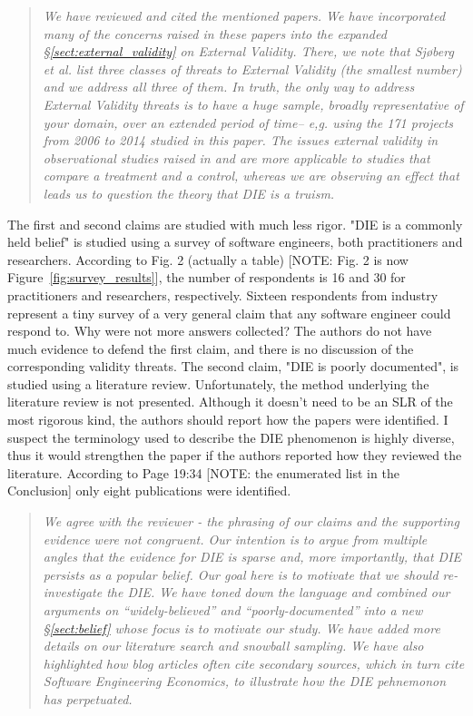 \documentclass[smallcondensed]{svjour3}
\newcommand{\tion}[1]{\S\ref{sect:#1}}
\newcommand{\fig}[1]{Figure~\ref{fig:#1}}
\begin{document}
\begin{quote}{\em 
 We have reviewed and cited the mentioned papers. We have incorporated many of the concerns raised in these papers into the expanded \tion{external_validity} on External Validity.
 There, we note that Sj{\o}berg et al. list three classes of threats to External Validity (the smallest number) and we address all three of them. In truth, the only way to address External Validity threats is to have a huge sample, broadly representative of your domain, over an extended period of time-- e,g. using the 171 projects from 2006 to 2014 studied in this paper. The issues external validity in observational studies raised in \cite{madigan2014} and \cite{carlson2009} are more applicable to studies that compare a treatment and a control, whereas we are observing an effect that leads us to question the theory that DIE is a truism.
}\end{quote}

The first and second claims are studied with much less
rigor. "DIE is a commonly held belief" is studied using a
survey of software engineers, both practitioners and
researchers. According to Fig. 2 (actually a table) [NOTE: Fig. 2 is now \fig{survey_results}], the
number of respondents is 16 and 30 for practitioners and
researchers, respectively. Sixteen respondents from industry
represent a tiny survey of a very general claim that any
software engineer could respond to. Why were not more
answers collected? The authors do not have much evidence to
defend the first claim, and there is no discussion of the
corresponding validity threats. The second claim, "DIE is
poorly documented", is studied using a literature review.
Unfortunately, the method underlying the literature review
is not presented. Although it doesn't need to be an SLR of
the most rigorous kind, the authors should report how the
papers were identified. I suspect the terminology used to
describe the DIE phenomenon is highly diverse, thus it would
strengthen the paper if the authors reported how they
reviewed the literature. According to Page 19:34 [NOTE: the enumerated list in the Conclusion] only eight
publications were identified. 


\begin{quote}{\em We agree with the reviewer - the phrasing of our claims and the supporting evidence were not congruent. Our intention is to argue from multiple angles that the evidence for DIE is sparse and, more importantly, that DIE persists as a popular belief. Our goal here is to motivate that we should re-investigate the DIE. We have toned down the language and combined our arguments on ``widely-believed'' and ``poorly-documented'' into a new \tion{belief} whose focus is to motivate our study. We have added more details on our literature search and snowball sampling. We have also highlighted how blog articles often cite secondary sources, which in turn cite Software Engineering Economics, to illustrate how the DIE pehnemonon has perpetuated.}\end{quote}
\end{document}
